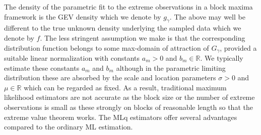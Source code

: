 \documentclass[10pt, a4paper, oneside]{article}
\newcommand{\field}[1]{\mathbb{#1}}
\newcommand{\real}{\ensuremath{{\field{R}}}}
\begin{document}
The density of the parametric fit to the extreme observations in a block maxima framework is the GEV density which we denote by $g_{\gamma}$. The above may well be different to the true unknown density underlying the sampled data which we denote by $f$. The less stringent assumption we make is that the corresponding distribution function belongs to some max-domain of attraction of $G_\gamma$, provided a suitable linear normalization with constants $a_m>0$ and $b_m\in \real$. We typically estimate these constants $a_m$ and $b_m$ although in the parametric limiting distribution these are absorbed by the scale and location parameters $\sigma>0$ and $\mu \in \real$ which can be regarded as fixed. As a result, traditional maximum likelihood estimators are not accurate as the block size or the number of extreme observations is small as these strongly on blocks of reasonable length so that the extreme value theorem works. The MLq estimators offer several advantages compared to the ordinary ML estimation.


\end{document}
